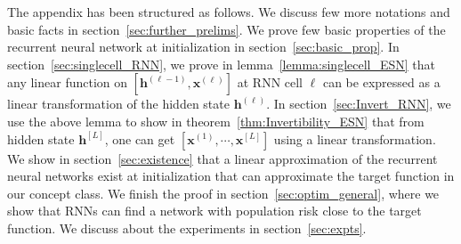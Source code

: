 \documentclass{article}
\theoremstyle{definition}
\theoremstyle{remark}
\theoremstyle{plain}
\theoremstyle{plain}
\theoremstyle{plain}
\theoremstyle{plain}
\newcommand{\bx}{\mathbf{x}}
\begin{document}


%

%

%





%

\newpage
\appendix
\tableofcontents
\vspace{10 mm}
The appendix has been structured as follows.   We discuss few more notations and basic facts in section~\ref{sec:further_prelims}. We prove few basic properties of the recurrent neural network at initialization in section~\ref{sec:basic_prop}. In section~\ref{sec:singlecell_RNN}, we prove in lemma~\ref{lemma:singlecell_ESN} that any linear function on $[\mathbf{h}^{(\ell-1)}, \mathbf{x}^{(\ell)}]$ at RNN cell $\ell$ can be expressed as a linear transformation of the hidden state $\mathbf{h}^{(\ell)}$. In section~\ref{sec:Invert_RNN}, we use the above lemma to show in theorem~\ref{thm:Invertibility_ESN} that from hidden state $\mathbf{h}^{[L]}$, one can get $[\bx^{(1)}, \cdots, \bx^{[L]}]$ using a linear transformation. We show in section~\ref{sec:existence} that a linear approximation of the recurrent neural networks exist at initialization that can approximate the target function in our concept class. We finish the proof in section~\ref{sec:optim_general}, where we show that RNNs can find a network with population risk close to the target function. We discuss about the experiments in section~\ref{sec:expts}.
\end{document}
